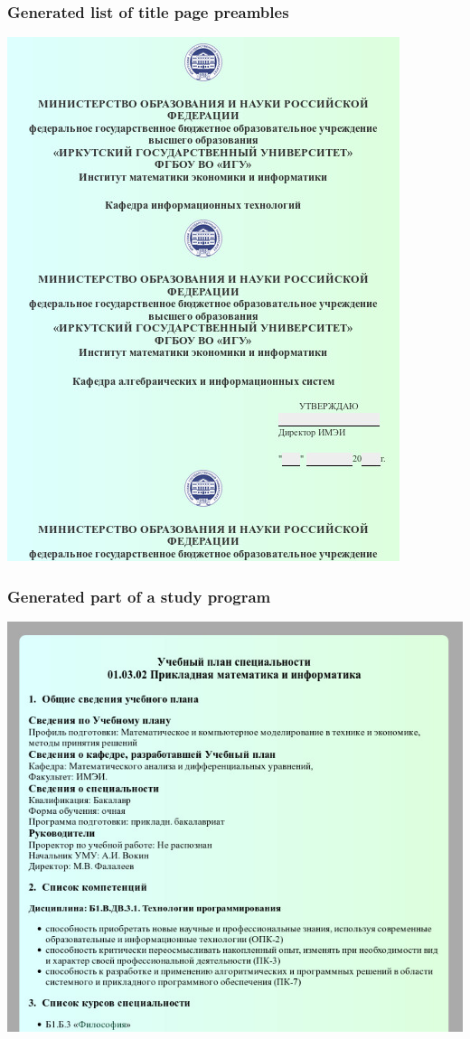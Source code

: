 \documentclass[10pt]{beamer}
\begin{document}
\begin{frame}
  \frametitle{Generated list of title page preambles}
    \begin{adjustwidth}{-2.5em}{-2.5em}
    \begin{center}
      \includegraphics[width=0.7\linewidth]{template-title-pages.jpg}
    \end{center}
  \end{adjustwidth}
\end{frame}

\begin{frame}
  \frametitle{Generated part of a study program}
   \begin{adjustwidth}{-2.5em}{-2.5em}
    \begin{center}
      \includegraphics[width=0.7\linewidth]{template-courses.jpg}
    \end{center}
  \end{adjustwidth}
\end{frame}
\end{document}
